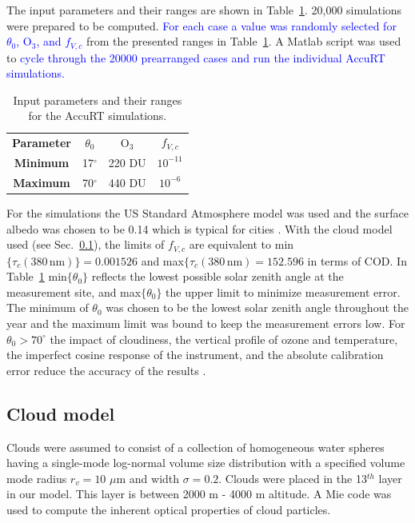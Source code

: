 \documentclass{optica-article}
\begin{document}
The input parameters and their ranges are shown in Table~\ref{tab:accurtinput_ozone}.
20,000 simulations were prepared to be computed.
\textcolor{blue}{For each case a value was randomly selected for $\theta_0$, O$_3$, and $f_{V,c}$} from the presented ranges in Table~\ref{tab:accurtinput_ozone}. 
A Matlab script was used to \textcolor{blue}{cycle through the 20000 prearranged cases and run the individual AccuRT simulations.}

\begin{table}[H]	
	\centering
	\begin{tabular}{|c|c|c|c|}
		\hline
		\textbf{Parameter}	& $\theta_0$ & O$_3$ & $f_{V,c}$  \\
		\Xhline{2\arrayrulewidth}
		\textbf{Minimum	}& 17$^{\circ}$ & 220 DU & $10^{-11}$  \\
		\textbf{Maximum	}& 70$^{\circ}$ & 440 DU & $10^{-6}$ \\
		\hline
	\end{tabular}
	\caption{Input parameters and their ranges for the AccuRT simulations.}
	\label{tab:accurtinput_ozone}
\end{table}

For the simulations the US Standard Atmosphere \cite{USstandardatmosphere} model was used and the surface albedo was chosen to be 0.14 which is typical for cities \cite{Sugawara:2014}.
With the cloud model used (see Sec.~\ref{sec-cloud}), the limits of $f_{V,c}$ are equivalent to min$\{\tau_c(380 \, \text{nm})\} = 0.001526$ and max$\{\tau_c(380 \, \text{nm}) = 152.596$ in terms of COD.
In Table~\ref{tab:accurtinput_ozone} min$\{\theta_0\}$ reflects the lowest possible solar zenith angle at the measurement site, and  max$\{\theta_0\}$ the upper limit to minimize measurement error. 
The minimum of  $\theta_0$ was chosen to be the lowest solar zenith angle throughout the year and the maximum limit was bound to keep the measurement errors low. 
For $\theta_0 > 70^{\circ}$ the impact of cloudiness, the vertical profile of ozone and temperature, the imperfect cosine response of the instrument, and the absolute calibration error reduce the accuracy of the results \cite{Kazantzidis:2009}.


 \subsection{Cloud model}
 \label{sec-cloud}

Clouds were assumed to consist of a collection of homogeneous water spheres having a single-mode log-normal volume size distribution with a specified volume mode radius $r_v=10$ $\mu$m and width $\sigma = 0.2$. 
Clouds were placed in the 13$^{th}$ layer in our model. 
This layer is between 2000 m - 4000 m altitude.
A Mie code was used to compute the inherent optical properties of cloud particles.
\end{document}
